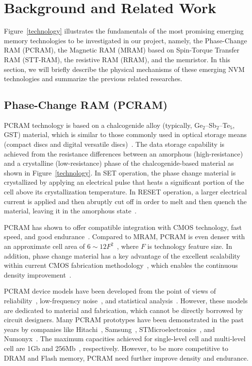 \section{Background and Related Work}

Figure~\ref{technology} illustrates the fundamentals of the most promising emerging memory technologies to be investigated in our project, namely, the Phase-Change RAM (PCRAM), the Magnetic RAM (MRAM) based on Spin-Torque Transfer RAM (STT-RAM), the resistive RAM (RRAM), and the memristor. In this section, we will briefly describe the physical mechanisms of these emerging NVM technologies and summarize the previous related researches.

\subsection{Phase-Change RAM (PCRAM)}
PCRAM technology is based on a chalcogenide alloy (typically, Ge$_2$--Sb$_2$--Te$_5$, GST) material, which is similar to those commonly used in optical storage means (compact discs and digital versatile discs)~\cite{Bedeschi09}. The data storage capability is achieved from the resistance differences between an amorphous (high-resistance) and a crystalline (low-resistance) phase of the chalcogenide-based material as shown in Figure~\ref{technology}. In SET operation, the phase change material is crystallized by applying an electrical pulse that heats a significant portion of the cell above its crystallization temperature. In RESET operation, a larger electrical current is applied and then abruptly cut off in order to melt and then quench the material, leaving it in the amorphous state~\cite{burr:scm08}.

PCRAM has shown to offer compatible integration with CMOS technology, fast speed, and good endurance~\cite{Oh06,Pirovano03,Lai03}. Compared to MRAM, PCRAM is even denser with an approximate cell area of $6\sim12F^2$~\cite{ITRS07}, where $F$ is technology feature size. In addition, phase change material has a key advantage of the excellent scalability within current CMOS fabrication methodology~\cite{Cho05,Kim06,Lai01,Pirovano03,Raoux08}, which enables the continuous density improvement~\cite{Nirschl07,Chen07-iedm,Im08}.

PCRAM device models have been developed from the point of views of reliability~\cite{Ielmini07}, low-frequency noise~\cite{Fantini08}, and statistical analysis~\cite{Mantegazza07}. However, these models are dedicated to material and fabrication, which cannot be directly borrowed by circuit designers. Many PCRAM prototypes have been demonstrated in the past years by companies like Hitachi~\cite{Hanzawa07}, Samsung~\cite{Lee07-isscc}, STMicroelectronics~\cite{Bedeschi08, Sandre10}, and Numonyx~\cite{Villa10}. The maximum capacities achieved for single-level cell and multi-level cell are 1Gb and 256Mb~\cite{Villa10,Lee07-isscc}, respectively. However, to be more competitive to DRAM and Flash memory, PCRAM need further improve density and endurance.

